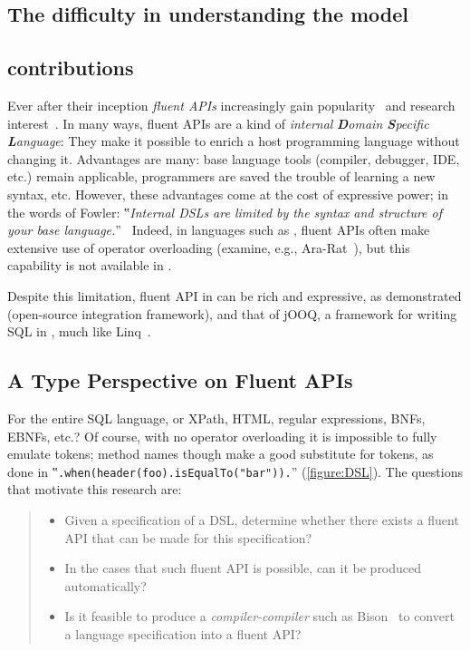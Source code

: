 \subsection{The difficulty in understanding the \Java model}

\subsection{contributions}

Ever after their inception \emph{fluent APIs}
  increasingly gain popularity~\cite{Bauer:2005,Freeman:Pryce:06,Larsen:2012} and research
  interest~\cite{Deursen:2000,Kabanov:2008}.
In many ways, fluent APIs are a kind of
  \emph{internal} \emph{\textbf Domain \textbf Specific \textbf Language}:
They make it possible to enrich a host programming language without changing it.
Advantages are many: base language tools (compiler, debugger, IDE, etc.) remain
  applicable, programmers are saved the trouble of learning a new syntax, etc.
However, these advantages come at the cost of expressive power;
  in the words of Fowler:
  ‟\emph{Internal DSLs are limited by the syntax and structure of your base language.}”~\cite{Fowler:2005}
Indeed, in languages such as \CC, fluent APIs
  often make extensive use of operator overloading (examine, e.g., \textsf{Ara-Rat}~\cite{Gil:Lenz:07}),
  but this capability is not available in \Java.

Despite this limitation, fluent API in \Java can be rich and expressive, as demonstrated
(open-source integration framework),
and that of jOOQ, a framework for writing
  SQL in \Java, much like Linq~\cite{Meijer:Beckman:Bierman:06}.

\subsection{A Type Perspective on Fluent APIs}
For the entire SQL language,
or XPath, HTML, regular expressions, BNFs, EBNFs, etc.?
Of course, with no operator overloading it is impossible
to fully emulate tokens; method names though make a good substitute for tokens, as done
in ‟\lstinline{.when(header(foo).isEqualTo("bar")).}” (\cref{figure:DSL}).
The questions that motivate this research are:
\begin{quote}
  \begin{itemize}
    \item Given a specification of a DSL, determine whether there exists
        a fluent API that can be made for this specification?
    \item In the cases that such fluent API is possible,
      can it be produced automatically?
    \item Is it feasible to produce a \emph{compiler-compiler} such as Bison~\cite{Bison:manual}
        to convert a language specification into a fluent API?
\end{itemize}
\end{quote}


